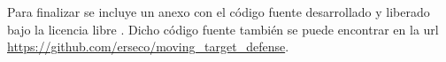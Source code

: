 \bigskip
Para finalizar se incluye un anexo con el código fuente desarrollado y liberado bajo la licencia libre \cite{free_software_foundation_gnu_2007}. Dicho código fuente también se puede encontrar en la url \url{https://github.com/erseco/moving_target_defense}.











